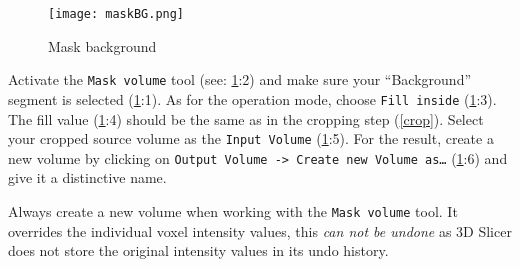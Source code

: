 \pagebreak
\begin{figure}[h!]
	\centerline{
		\texttt{[image: maskBG.png]}}
	\caption{Mask background}\label{fig:mBG}
\end{figure}
\noindent
Activate the \texttt{Mask volume} tool (see: \cref{fig:mBG}:2) and make sure your ``Background'' segment is selected (\cref{fig:mBG}:1).
As for the operation mode, choose \texttt{Fill inside} (\cref{fig:mBG}:3).
The fill value (\cref{fig:mBG}:4) should be the same as in the cropping step (\cref{crop}).
Select your cropped source volume as the \texttt{Input Volume} (\cref{fig:mBG}:5).
For the result, create a new volume by clicking on \texttt{Output Volume -> Create new Volume as\ldots} (\cref{fig:mBG}:6) and give it a distinctive name.
\newline %
\newline
\begin{minipage}{0.4\textwidth}
	\begin{center}
		
	\end{center}
\end{minipage}%
%
\begin{minipage}{0.5\textwidth}
	Always create a new volume when working with the \texttt{Mask volume} tool.
	It overrides the individual voxel intensity values, this \emph{can not be undone} as 3D Slicer does not store the original intensity values in its undo history.
\end{minipage}
\newline
\newline %
\pagebreak

